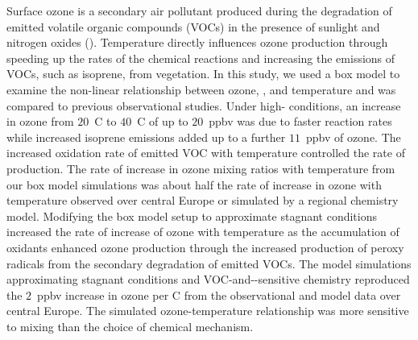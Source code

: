 Surface ozone is a secondary air pollutant produced during the degradation of emitted volatile organic compounds (VOCs) in the presence of sunlight and nitrogen oxides (). 
Temperature directly influences ozone production through speeding up the rates of the chemical reactions and increasing the emissions of VOCs, such as isoprene, from vegetation.
In this study, we used a box model to examine the non-linear relationship between ozone, , and temperature and was compared to previous observational studies.
Under high- conditions, an increase in ozone from $20$~\degree C to $40$~\degree C of up to $20$~ppbv was due to faster reaction rates while increased isoprene emissions added up to a further $11$~ppbv of ozone.
The increased oxidation rate of emitted VOC with temperature controlled the rate of  production.
The rate of increase in ozone mixing ratios with temperature from our box model simulations was about half the rate of increase in ozone with temperature observed over central Europe or simulated by a regional chemistry model.
Modifying the box model setup to approximate stagnant conditions increased the rate of increase of ozone with temperature as the accumulation of oxidants enhanced ozone production through the increased production of peroxy radicals from the secondary degradation of emitted VOCs.
The model simulations approximating stagnant conditions and VOC-and--sensitive chemistry reproduced the $2$~ppbv increase in ozone per \degree C from the observational and model data over central Europe.
The simulated ozone-temperature relationship was more sensitive to mixing than the choice of chemical mechanism.

